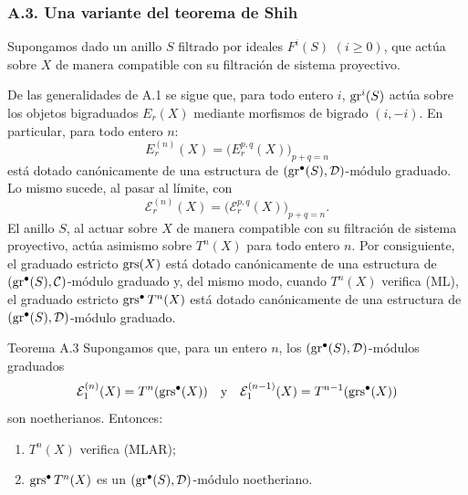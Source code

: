 \subsubsection*{A.3. Una variante del teorema de Shih}
Supongamos dado un anillo \(S\) filtrado por ideales \(F^i(S)\) \((i\ge0)\), que actúa sobre \(X\) de manera compatible con su filtración de sistema proyectivo.

De las generalidades de A.1 se sigue que, para todo entero \(i\), \(\operatorname{gr}^i(S)\) actúa sobre los objetos bigraduados \(E_r(X)\) mediante morfismos de bigrado \((i,-i)\). En particular, para todo entero \(n\):
\[
E_r^{(n)}(X)=\bigl(E_r^{p,q}(X)\bigr)_{p+q=n}
\]
está dotado canónicamente de una estructura de \((\operatorname{gr}^\bullet(S),\mathcal D)\)-módulo graduado. Lo mismo sucede, al pasar al límite, con
\[
\mathcal E_r^{(n)}(X)=\bigl(\mathcal E_r^{p,q}(X)\bigr)_{p+q=n}.
\]
El anillo \(S\), al actuar sobre \(X\) de manera compatible con su filtración de sistema proyectivo, actúa asimismo sobre \(T^n(X)\) para todo entero \(n\). Por consiguiente, el graduado estricto \(\operatorname{grs}(X)\) está dotado canónicamente de una estructura de \((\operatorname{gr}^\bullet(S),\mathcal C)\)-módulo graduado y, del mismo modo, cuando \(T^n(X)\) verifica (ML), el graduado estricto \(\operatorname{grs}^\bullet T^n(X)\) está dotado canónicamente de una estructura de \((\operatorname{gr}^\bullet(S),\mathcal D)\)-módulo graduado.

\begin{statement}{Teorema A.3}
Supongamos que, para un entero \(n\), los \((\operatorname{gr}^\bullet(S),\mathcal D)\)-módulos graduados
\[
\mathcal E_1^{(n)}(X)=T^n(\operatorname{grs}^\bullet(X))
\quad\text{y}\quad
\mathcal E_1^{(n-1)}(X)=T^{n-1}(\operatorname{grs}^\bullet(X))
\]
son noetherianos. Entonces:
\begin{enumerate}[label=\textup{(\roman*)}]
\item \(T^n(X)\) verifica (MLAR);
\item \(\operatorname{grs}^\bullet T^n(X)\) es un \((\operatorname{gr}^\bullet(S),\mathcal D)\)-módulo noetheriano.
\end{enumerate}
\end{statement}
